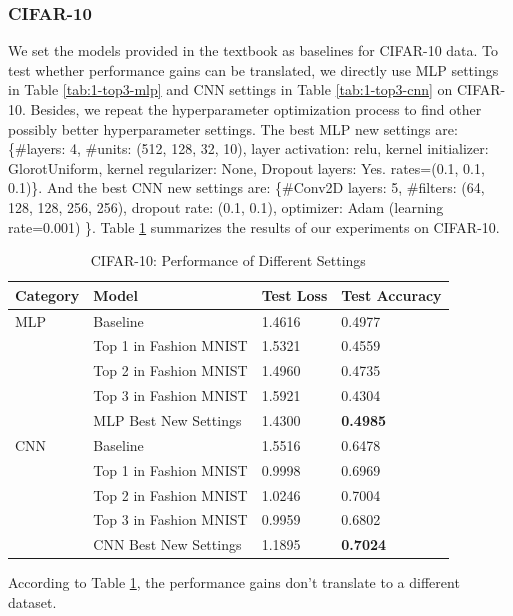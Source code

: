 \documentclass{article}
\begin{document}
\subsubsection{CIFAR-10}
We set the models provided in the textbook as baselines for CIFAR-10 data. To test whether performance gains can be translated, we directly use MLP settings in Table \ref{tab:1-top3-mlp} and CNN settings in Table \ref{tab:1-top3-cnn} on CIFAR-10. Besides, we repeat the hyperparameter optimization process to find other possibly better hyperparameter settings. The best MLP new settings are: \{\#layers: 4, \#units: (512, 128, 32, 10), layer activation: relu, kernel initializer: GlorotUniform, kernel regularizer: None, Dropout layers: Yes. rates=(0.1, 0.1, 0.1)\}. And the best CNN new settings are: \{\#Conv2D layers: 5, \#filters: (64, 128, 128, 256, 256), dropout rate: (0.1, 0.1), optimizer: Adam (learning rate=0.001) \}. Table \ref{tab:1-cifar} summarizes the results of our experiments on CIFAR-10.
\begin{table}[!ht]
    \centering
    \caption{CIFAR-10: Performance of Different Settings}
    \label{tab:1-cifar}
    \begin{tabular}{llll}
        \toprule
        \textbf{Category} & \textbf{Model} & \textbf{Test Loss} & \textbf{Test Accuracy}\\
        \midrule
        MLP & Baseline & 1.4616 & 0.4977\\
            & Top 1 in Fashion MNIST & 1.5321 & 0.4559\\
            & Top 2 in Fashion MNIST & 1.4960 & 0.4735\\
            & Top 3 in Fashion MNIST & 1.5921 & 0.4304\\
            & MLP Best New Settings & 1.4300 & \textbf{0.4985}\\
        \midrule
        CNN & Baseline & 1.5516 & 0.6478\\
            & Top 1 in Fashion MNIST & 0.9998 & 0.6969\\
            & Top 2 in Fashion MNIST & 1.0246 & 0.7004\\
            & Top 3 in Fashion MNIST & 0.9959 & 0.6802\\
            & CNN Best New Settings & 1.1895 & \textbf{0.7024}\\
        \bottomrule
    \end{tabular}
\end{table}
\par
According to Table \ref{tab:1-cifar}, the performance gains don't translate to a different dataset.
\end{document}
